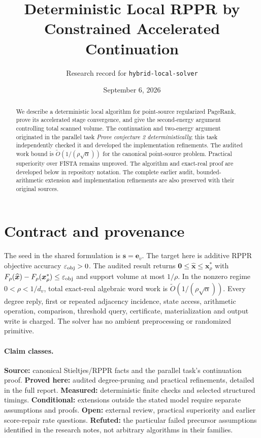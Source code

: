 \documentclass[11pt]{article}
\title{Deterministic Local RPPR by\\Constrained Accelerated Continuation}
\author{Research record for \texttt{hybrid-local-solver}}
\date{September 6, 2026}
\begin{document}
\maketitle
\begin{abstract}
We describe a deterministic local algorithm for point-source regularized
PageRank, prove its accelerated stage convergence, and give the second-energy
argument controlling total scanned volume. The continuation and two-energy argument originated
in the parallel task \emph{Prove conjecture 2 deterministically}; this task
independently checked it and developed the implementation refinements.
The audited work bound is $\widetilde O(1/(\rho\sqrt\alpha))$ for the
canonical point-source problem. Practical superiority over FISTA remains
unproved. The algorithm and exact-real proof are developed below in repository
notation. The complete earlier audit, bounded-arithmetic extension and
implementation refinements are also preserved with their original sources.
\end{abstract}

\section{Contract and provenance}
\label{sec:archive-contract}


The seed in the shared formulation is $\bm{s}=\bm{e}_v$.
The target here is additive RPPR objective accuracy $\varepsilon_{\mathrm{obj}}>0$.
The audited result returns $\bm{0}\leq\widehat{\bm{x}}\leq\bm{x}_\rho^*$
with $F_\rho(\widehat{\bm{x}})-F_\rho(\bm{x}_\rho^*)\leq\varepsilon_{\mathrm{obj}}$
and support volume at most $1/\rho$. In the nonzero regime
$0<\rho<1/d_v$, total exact-real algebraic word work is
$\widetilde O(1/(\rho\sqrt\alpha))$. Every degree reply, first or repeated
adjacency incidence, state access, arithmetic operation, comparison,
threshold query, certificate, materialization and output write is charged.
The solver has no ambient preprocessing or randomized primitive.

\paragraph{Claim classes.}
\textbf{Source:} canonical Stieltjes/RPPR facts and the parallel task's
continuation proof. \textbf{Proved here:} audited degree-pruning and practical
refinements, detailed in the full report. \textbf{Measured:} deterministic
finite checks and selected structured timings. \textbf{Conditional:}
extensions outside the stated model require separate assumptions and proofs.
\textbf{Open:} external review, practical superiority and earlier score-repair
rate questions. \textbf{Refuted:} the particular failed precursor assumptions
identified in the research notes, not arbitrary algorithms in their families.
\end{document}
